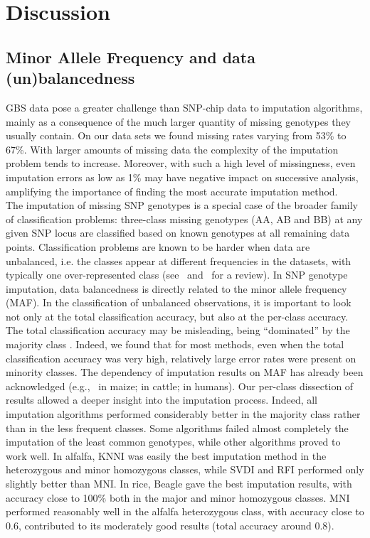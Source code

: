 \section{Discussion}
\label{sec:discussion}

\subsection{Minor Allele Frequency and data (un)balancedness}
\label{sec:maf}
GBS data pose a greater challenge than SNP-chip data to imputation algorithms, mainly as a consequence of the much larger quantity of missing genotypes they usually contain. On our data sets we found missing rates varying from 53\% to 67\%. With larger amounts of missing data the complexity of the imputation problem tends to increase. Moreover, with such a high level of missingness, even imputation errors as low as 1\% may have negative impact on successive analysis, amplifying the importance of finding the most accurate imputation method.\\
The imputation of missing SNP genotypes is a special case of the broader family of classification problems: three-class missing genotypes (AA, AB and BB) at any given SNP locus are classified based on known genotypes at all remaining data points. Classification problems are known to be harder when data are unbalanced, i.e. the classes appear at different frequencies in the datasets, with typically one over-represented class
(see~\cite{kotsiantis_handling_2006}
and~\cite{sun_classification_2009} for a review). In SNP genotype imputation, data balancedness is directly related to the minor allele frequency (MAF). In the classification of unbalanced observations, it is important to look not only at the total classification accuracy, but also at the per-class accuracy. The total classification accuracy may be misleading, being ``dominated'' by the majority class
\cite{he_learning_2009}.
Indeed, we found that for most methods, even when the total classification accuracy was very high, relatively large error rates were present on minority classes. 
The dependency of imputation results on MAF has already been acknowledged  (e.g.,~\cite{hickey_factors_2012} in maize; \cite{ma_comparison_2013} in cattle; \cite{pei_analyses_2008} in humans). Our per-class dissection of results allowed a deeper insight into the imputation process. Indeed, all imputation algorithms performed considerably better in the majority class rather than in the less frequent classes.
Some algorithms failed almost completely the imputation of the least common genotypes, while other algorithms proved to work well. In alfalfa, KNNI was easily the best imputation method in the heterozygous and minor homozygous classes, while SVDI and RFI performed only slightly better than MNI. In rice, Beagle gave the best imputation results, with accuracy close to 100\% both in the major and minor homozygous classes. MNI performed reasonably well in the alfalfa heterozygous class, with accuracy close to 0.6, contributed to its moderately good results (total accuracy around 0.8).

